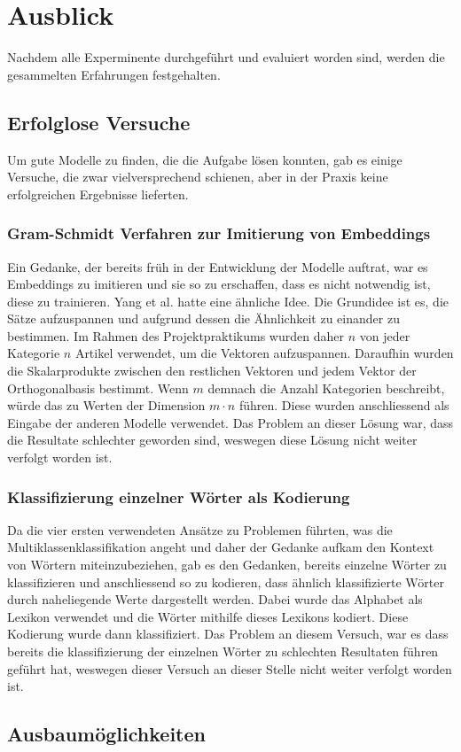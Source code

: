 \section{Ausblick}
Nachdem alle Experminente durchgeführt und evaluiert worden sind, werden die gesammelten Erfahrungen festgehalten.

\subsection{Erfolglose Versuche}
Um gute Modelle zu finden, die die Aufgabe lösen konnten, gab es einige Versuche, die zwar vielversprechend schienen, aber in der Praxis keine erfolgreichen Ergebnisse lieferten.

\subsubsection{Gram-Schmidt Verfahren zur Imitierung von Embeddings}
Ein Gedanke, der bereits früh in der Entwicklung der Modelle auftrat, war es Embeddings zu imitieren und sie so zu erschaffen, dass es nicht notwendig ist, diese zu trainieren. Yang et al. \cite{yang2019zerotraining} hatte eine ähnliche Idee. Die Grundidee ist es, die Sätze aufzuspannen und aufgrund dessen die Ähnlichkeit zu einander zu bestimmen. Im Rahmen des Projektpraktikums wurden daher $n$ von jeder Kategorie $n$ Artikel verwendet, um die Vektoren aufzuspannen. Daraufhin wurden die Skalarprodukte zwischen den restlichen Vektoren und jedem Vektor der Orthogonalbasis bestimmt. Wenn $m$ demnach die Anzahl Kategorien beschreibt, würde das zu Werten der Dimension $m \cdot n$ führen. Diese wurden anschliessend als Eingabe der anderen Modelle verwendet. Das Problem an dieser Lösung war, dass die Resultate schlechter geworden sind, weswegen diese Lösung nicht weiter verfolgt worden ist.

\subsubsection{Klassifizierung einzelner Wörter als Kodierung}
Da die vier ersten verwendeten Ansätze zu Problemen führten, was die Multiklassenklassifikation angeht und daher der Gedanke aufkam den Kontext von Wörtern miteinzubeziehen, gab es den Gedanken, bereits einzelne Wörter zu klassifizieren und anschliessend so zu kodieren, dass ähnlich klassifizierte Wörter durch naheliegende Werte dargestellt werden. Dabei wurde das Alphabet als Lexikon verwendet und die Wörter mithilfe dieses Lexikons kodiert. Diese Kodierung wurde dann klassifiziert. Das Problem an diesem Versuch, war es dass bereits die klassifizierung der einzelnen Wörter zu schlechten Resultaten führen geführt hat, weswegen dieser Versuch an dieser Stelle nicht weiter verfolgt worden ist.


\subsection{Ausbaumöglichkeiten}

